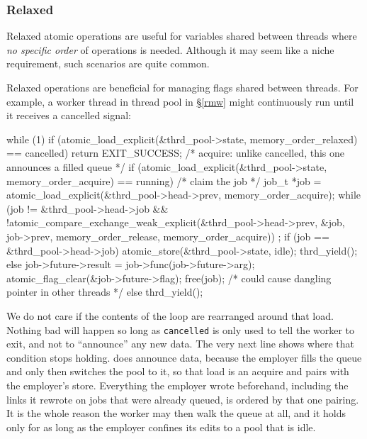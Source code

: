 \documentclass[fontsize=10pt, oneside]{scrartcl}
\newcommand{\secref}[1]{\hyperref[#1]{\textsc{\S}\ref*{#1}}}
\begin{document}
\subsubsection{Relaxed}
Relaxed atomic operations are useful for variables shared between threads where \emph{no specific order} of operations is needed.
Although it may seem like a niche requirement, such scenarios are quite common.

Relaxed operations are beneficial for managing flags shared between threads.
For example, a worker thread in thread pool in \secref{rmw} might continuously run until it receives a cancelled signal:
\begin{ccode}
while (1) {
    if (atomic_load_explicit(&thrd_pool->state, memory_order_relaxed) == cancelled)
        return EXIT_SUCCESS;
    /* acquire: unlike cancelled, this one announces a filled queue */
    if (atomic_load_explicit(&thrd_pool->state, memory_order_acquire) == running) {
        /* claim the job */
        job_t *job = atomic_load_explicit(&thrd_pool->head->prev,
                                          memory_order_acquire);
        while (job != &thrd_pool->head->job &&
               !atomic_compare_exchange_weak_explicit(&thrd_pool->head->prev,
                                                      &job, job->prev,
                                                      memory_order_release,
                                                      memory_order_acquire))
            ;
        if (job == &thrd_pool->head->job) {
            atomic_store(&thrd_pool->state, idle);
            thrd_yield();
        } else {
            job->future->result = job->func(job->future->arg);
            atomic_flag_clear(&job->future->flag);
            free(job); /* could cause dangling pointer in other threads */
        }
    } else {
        thrd_yield();
    }
}
\end{ccode}
We do not care if the contents of the loop are rearranged around that load.
Nothing bad will happen so long as \texttt{cancelled} is only used to tell the worker to exit, and not to ``announce'' any new data.
The very next line shows where that condition stops holding.
 does announce data, because the employer fills the queue and only then switches the pool to it,
so that load is an acquire and pairs with the employer's store.
Everything the employer wrote beforehand, including the links it rewrote on jobs that were already queued, is ordered by that one pairing.
It is the whole reason the worker may then walk the queue at all,
and it holds only for as long as the employer confines its edits to a pool that is idle.
\end{document}

